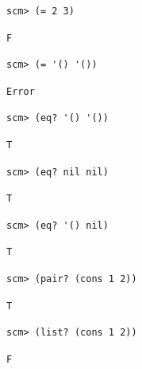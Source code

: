 \documentclass{exam}
\begin{document}
\begin{questions}
\begin{blocksection}
\begin{lstlisting}
scm> (= 2 3)
\end{lstlisting}
\begin{solution}[.25in]
\begin{lstlisting}
F
\end{lstlisting}
\end{solution}

\begin{lstlisting}
scm> (= '() '())
\end{lstlisting}
\begin{solution}[.25in]
\begin{lstlisting}
Error
\end{lstlisting}
\end{solution}

\begin{lstlisting}
scm> (eq? '() '())
\end{lstlisting}
\begin{solution}[.25in]
\begin{lstlisting}
T
\end{lstlisting}
\end{solution}

\begin{lstlisting}
scm> (eq? nil nil)
\end{lstlisting}
\begin{solution}[.25in]
\begin{lstlisting}
T
\end{lstlisting}
\end{solution}

\begin{lstlisting}
scm> (eq? '() nil)
\end{lstlisting}
\begin{solution}[.25in]
\begin{lstlisting}
T
\end{lstlisting}
\end{solution}

\begin{lstlisting}
scm> (pair? (cons 1 2))
\end{lstlisting}
\begin{solution}[.25in]
\begin{lstlisting}
T
\end{lstlisting}
\end{solution}

\begin{lstlisting}
scm> (list? (cons 1 2))
\end{lstlisting}
\begin{solution}[.25in]
\begin{lstlisting}
F
\end{lstlisting}
\end{solution}
\end{blocksection}


\end{questions}
\end{document}
